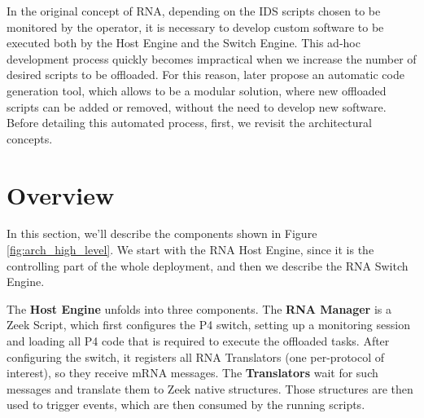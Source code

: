 In the original concept of RNA, depending on the IDS scripts chosen to be monitored by the operator, it is necessary to develop custom software to be executed both by the Host Engine and the Switch Engine. This ad-hoc development process quickly becomes impractical when we increase the number of desired scripts to be offloaded. For this reason, later propose an automatic code generation tool, which allows \TheSolutionName{} to be a modular solution, where new offloaded scripts can be added or removed, without the need to develop new software. Before detailing this automated process, first, we revisit the architectural concepts.

\section{Overview}

In this section, we'll describe the components shown in Figure \ref{fig:arch_high_level}. We start with the RNA Host Engine, since it is the controlling part of the whole deployment, and then we describe the RNA Switch Engine.


The \textbf{Host Engine} unfolds into three components. The \textbf{RNA Manager} is a Zeek Script, which first configures the P4 switch, setting up a monitoring session and loading all P4 code that is required to execute the offloaded tasks. After configuring the switch, it registers all RNA Translators (one per-protocol of interest), so they receive mRNA messages. The \textbf{Translators} wait for such messages and translate them to Zeek native structures. Those structures are then used to trigger events, which are then consumed by the running scripts.


